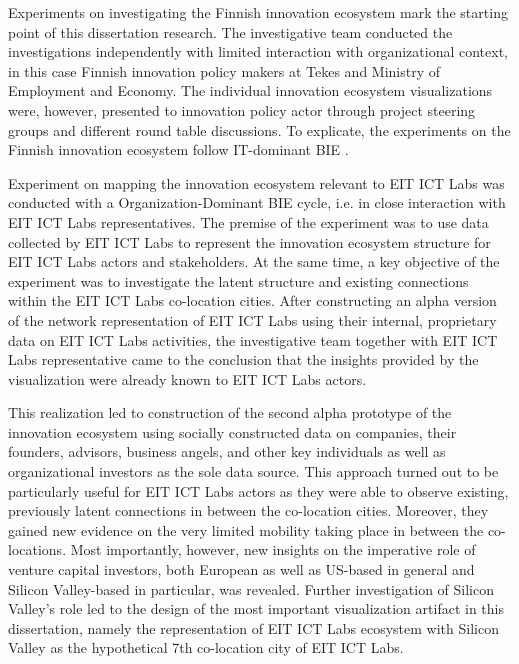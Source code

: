 Experiments on investigating the Finnish innovation ecosystem mark the starting point of this dissertation research. The investigative team conducted the investigations independently with limited interaction with organizational context, in this case Finnish innovation policy makers at Tekes and Ministry of Employment and Economy. The individual innovation ecosystem visualizations were, however, presented to innovation policy actor through project steering groups and different round table discussions. To explicate, the experiments on the Finnish innovation ecosystem follow IT-dominant BIE \citep[cf.][]{Sein2011ActionResearch}.

Experiment on mapping the innovation ecosystem relevant to EIT ICT Labs was conducted with a Organization-Dominant BIE cycle, i.e. in close interaction with EIT ICT Labs representatives. The premise of the experiment was to use data collected by EIT ICT Labs to represent the innovation ecosystem structure for EIT ICT Labs actors and stakeholders. At the same time, a key objective of the experiment was to investigate the latent structure and existing connections within the EIT ICT Labs co-location cities. After constructing an alpha version of the network representation of EIT ICT Labs using their internal, proprietary data on EIT ICT Labs activities, the investigative team together with EIT ICT Labs representative came to the conclusion that the insights provided by the visualization were already known to EIT ICT Labs actors. 

This realization led to construction of the second alpha prototype of the innovation ecosystem using socially constructed data on companies, their founders, advisors, business angels, and other key individuals as well as organizational investors as the sole data source. This approach turned out to be particularly useful for EIT ICT Labs actors as they were able to observe existing, previously latent connections in between the co-location cities. Moreover, they gained new evidence on the very limited mobility taking place in between the co-locations. Most importantly, however, new insights on the imperative role of venture capital investors, both European as well as US-based in general and Silicon Valley-based in particular, was revealed. Further investigation of Silicon Valley's role led to the design of the most important visualization artifact in this dissertation, namely the representation of EIT ICT Labs ecosystem with Silicon Valley as the hypothetical 7th co-location city of EIT ICT Labs.

